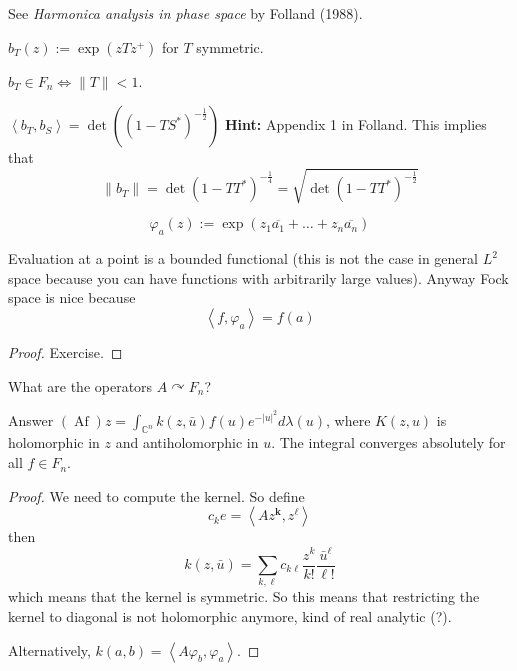 \begin{remark}\leavevmode
	See \textit{Harmonica analysis in phase space} by Folland (1988).
\end{remark}

\begin{defn}\leavevmode
	$b_T(z):=\operatorname{exp}(zTz^+)$ for $T$ symmetric.
\end{defn}

\begin{claim}\leavevmode
	$b_T\in F_n \iff \|T\|<1$.
\end{claim}

\begin{exercise}\leavevmode
	$\left<b_T,b_S\right> =\det ( (1-TS^*)^{-\frac{1}{2}} )$ \textbf{Hint:} Appendix 1 in Folland. This implies that
	\[\|b_T\|=\det (1-T T^* )^{-\frac{1}{4}}=\sqrt{\det (1-T T^*)^{-\frac{1}{2}}} \]
\end{exercise}

\begin{defn}\leavevmode
	\[\varphi_a(z):=\operatorname{exp}(z_1\overline{a_1}+\ldots +z_n\overline{a_n})\]
\end{defn}

\begin{claim}\leavevmode
	Evaluation at a point is a bounded functional (this is not the case in general  $L^2$ space because you can have functions with arbitrarily large values). Anyway Fock space is nice because
	\[\left<f,\varphi_a\right> =f(a)\]
\end{claim}
\begin{proof}\leavevmode
	Exercise.
\end{proof}

\begin{question}\leavevmode
	What are the operators $A\curvearrowright F_n$?
\end{question}

\begin{thing5}{Answer}\leavevmode
	$(\operatorname{Af})z=\int_{\mathbb{C}^{n}}k(z,\bar{u})f(u)e^{-|u|^2} d \lambda(u)$, where $K(z,u)$ is holomorphic in  $z$ and antiholomorphic in $u$. The integral converges absolutely for all $f \in F_n$.
\end{thing5}

\begin{proof}\leavevmode
	We need to compute the kernel. So define
	\[c_ke=\left<Az^{\mathbf{k}},z^\ell\right> \]
	then
	\[k(z,\bar{u} )=\sum_{k,\ell}c_{k\ell}\frac{z^k}{k!}\frac{\bar{u} ^\ell}{\ell!}\]
	which means that the kernel is symmetric. So this means that restricting the kernel to diagonal is not holomorphic anymore, kind of real analytic (?).

	Alternatively, $k(a,b)=\left<A\varphi_b,\varphi_a\right> $.
\end{proof}

